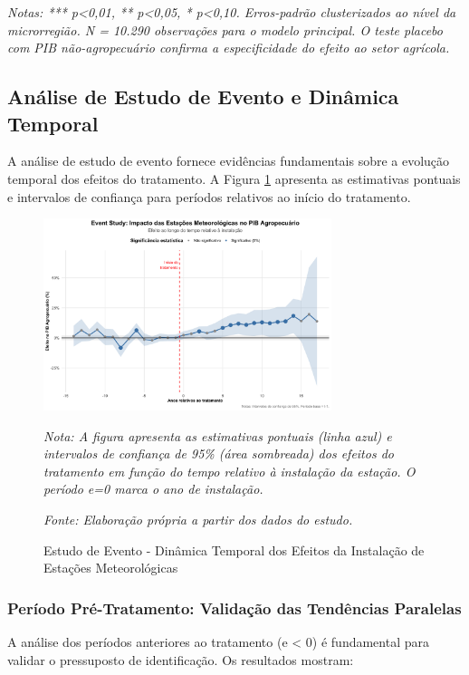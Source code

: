 \documentclass[
	12pt,				%
	oneside,			%
	a4paper,			%
	english,			%
	french,				%
	spanish,			%
	brazil				%
	]{abntex2}
\begin{document}
\textit{Notas: *** p<0,01, ** p<0,05, * p<0,10. Erros-padrão clusterizados ao nível da microrregião. N = 10.290 observações para o modelo principal. O teste placebo com PIB não-agropecuário confirma a especificidade do efeito ao setor agrícola.}

\subsection{Análise de Estudo de Evento e Dinâmica Temporal}

A análise de estudo de evento fornece evidências fundamentais sobre a evolução temporal dos efeitos do tratamento. A Figura \ref{fig:eventstudy} apresenta as estimativas pontuais e intervalos de confiança para períodos relativos ao início do tratamento.

\begin{figure}[H]
\centering
\caption{Estudo de Evento - Dinâmica Temporal dos Efeitos da Instalação de Estações Meteorológicas}
\label{fig:eventstudy}
\includegraphics[width=0.75\textwidth]{../../../data/outputs/presentation/event_study_enhanced.png}

\textit{Nota: A figura apresenta as estimativas pontuais (linha azul) e intervalos de confiança de 95\% (área sombreada) dos efeitos do tratamento em função do tempo relativo à instalação da estação. O período e=0 marca o ano de instalação.}

\textit{Fonte: Elaboração própria a partir dos dados do estudo.}
\end{figure}

\subsubsection{Período Pré-Tratamento: Validação das Tendências Paralelas}

A análise dos períodos anteriores ao tratamento (e < 0) é fundamental para validar o pressuposto de identificação. Os resultados mostram:
\end{document}
